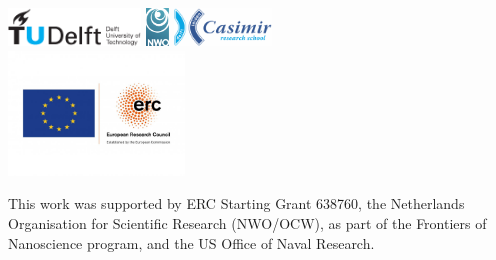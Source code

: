\begin{titlepage}
\begin{tabular}{p{4cm}l}

\end{tabular}


\vspace{2\bigskipamount}
\begin{center}
    \includegraphics[height=0.4in]{title/logos/tudelft}
    \hspace{2em}
    \includegraphics[height=0.4in]{title/logos/nwo}
    \hspace{2em}
    \includegraphics[height=0.4in]{title/logos/casimir} \\
    \includegraphics[height=1.3in]{title/logos/erc_eu}
\end{center}

\noindent This work was supported by ERC Starting Grant 638760, the Netherlands Organisation for Scientific Research (NWO/OCW), as part of the Frontiers of Nanoscience program, and the US Office of Naval Research.
\vspace{1\bigskipamount}


\end{titlepage}
